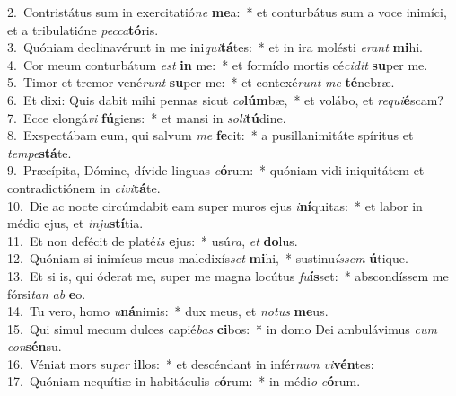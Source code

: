{2.~}Contristátus sum in exercitatió\textit{ne} \textbf{me}a:~* et conturbátus sum a voce inimíci, et a tribulatióne \textit{pec}\textit{ca}\textbf{tó}ris.\\
{3.~}Quóniam declinavérunt in me ini\textit{qui}\textbf{tá}tes:~* et in ira molésti \textit{e}\textit{rant} \textbf{mi}hi.\\
{4.~}Cor meum conturbátum \textit{est} \textbf{in} me:~* et formído mortis cé\textit{ci}\textit{dit} \textbf{su}per me.\\
{5.~}Timor et tremor vené\textit{runt} \textbf{su}per me:~* et contexé\textit{runt} \textit{me} \textbf{té}nebræ.\\
{6.~}Et dixi: Quis dabit mihi pennas sicut \textit{co}\textbf{lúm}bæ,~* et volábo, et \textit{re}\textit{qui}\textbf{é}scam?\\
{7.~}Ecce elongá\textit{vi} \textbf{fú}giens:~* et mansi in \textit{so}\textit{li}\textbf{tú}dine.\\
{8.~}Exspectábam eum, qui salvum \textit{me} \textbf{fe}cit:~* a pusillanimitáte spíritus et \textit{tem}\textit{pe}\textbf{stá}te.\\
{9.~}Præcípita, Dómine, dívide linguas \textit{e}\textbf{ó}rum:~* quóniam vidi iniquitátem et contradictiónem in \textit{ci}\textit{vi}\textbf{tá}te.\\
{10.~}Die ac nocte circúmdabit eam super muros ejus \textit{i}\textbf{ní}quitas:~* et labor in médio ejus, et \textit{in}\textit{ju}\textbf{stí}tia.\\
{11.~}Et non defécit de platé\textit{is} \textbf{e}jus:~* usú\textit{ra}, \textit{et} \textbf{do}lus.\\
{12.~}Quóniam si inimícus meus maledixís\textit{set} \textbf{mi}hi,~* sustinu\textit{ís}\textit{sem} \textbf{ú}tique.\\
{13.~}Et si is, qui óderat me, super me magna locútus \textit{fu}\textbf{ís}set:~* abscondíssem me fórsi\textit{tan} \textit{ab} \textbf{e}o.\\
{14.~}Tu vero, homo \textit{u}\textbf{ná}nimis:~* dux meus, et \textit{no}\textit{tus} \textbf{me}us.\\
{15.~}Qui simul mecum dulces capié\textit{bas} \textbf{ci}bos:~* in domo Dei ambulávimus \textit{cum} \textit{con}\textbf{sén}su.\\
{16.~}Véniat mors su\textit{per} \textbf{il}los:~* et descéndant in infér\textit{num} \textit{vi}\textbf{vén}tes:\\
{17.~}Quóniam nequítiæ in habitáculis \textit{e}\textbf{ó}rum:~* in médi\textit{o} \textit{e}\textbf{ó}rum.\\
